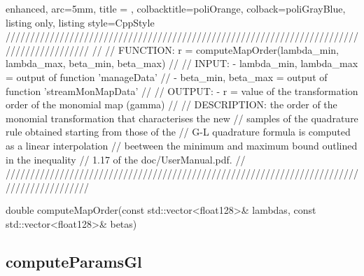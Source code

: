 \documentclass[a4paper, twosided]{book}
\begin{document}
\begin{tcblisting}{enhanced,
                   arc=5mm,
                   title = \color{black}{\large \ttfamily MonMap.cpp/computeMapOrder},
                   colbacktitle=poliOrange,
                   colback=poliGrayBlue,
                   listing only,
                   listing style=CppStyle}
/////////////////////////////////////////////////////////////////////////////////////////
//
//       FUNCTION: r = computeMapOrder({lambda_min, lambda_max}, {beta_min, beta_max})
//                
//          INPUT: - {lambda_min, lambda_max} = output of function 'manageData'
//                 - {beta_min, beta_max} = output of function 'streamMonMapData'
//
//         OUTPUT: - r = value of the transformation order of the monomial map (gamma)
//
//    DESCRIPTION: the order of the monomial transformation that characterises the new
//                 samples of the quadrature rule obtained starting from those of the
//                 G-L quadrature formula is computed as a linear interpolation
//                 beetween the minimum and maximum bound outlined in the inequality
//                 1.17 of the doc/UserManual.pdf.
//
/////////////////////////////////////////////////////////////////////////////////////////

double computeMapOrder(const std::vector<float128>& lambdas, const std::vector<float128>& betas)
\end{tcblisting}

\subsection[computeParamsGl]{\changefont computeParamsGl}\label{SubSec4.1.4}
\end{document}
